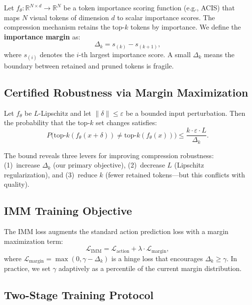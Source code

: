 \documentclass[10pt,twocolumn]{article}
\newcommand{\dk}{\Delta_k}
\newcommand{\eps}{\varepsilon}
\begin{document}
Let $f_\theta: \mathbb{R}^{N \times d} \to \mathbb{R}^N$ be a token importance scoring function (e.g., ACIS) that maps $N$ visual tokens of dimension $d$ to scalar importance scores. The compression mechanism retains the top-$k$ tokens by importance. We define the \textbf{importance margin} as:
\begin{equation}
    \dk = s_{(k)} - s_{(k+1)},
\end{equation}
where $s_{(i)}$ denotes the $i$-th largest importance score. A small $\dk$ means the boundary between retained and pruned tokens is fragile.

\subsection{Certified Robustness via Margin Maximization}

\begin{theorem}
\label{thm:bound}
Let $f_\theta$ be $L$-Lipschitz and let $\|\delta\| \leq \eps$ be a bounded input perturbation. Then the probability that the top-$k$ set changes satisfies:
\begin{equation}
    P\big(\text{top-}k(f_\theta(x + \delta)) \neq \text{top-}k(f_\theta(x))\big) \leq \frac{k \cdot \eps \cdot L}{\dk}.
    \label{eq:bound}
\end{equation}
\end{theorem}

The bound reveals three levers for improving compression robustness: (1)~increase $\dk$ (our primary objective), (2)~decrease $L$ (Lipschitz regularization), and (3)~reduce $k$ (fewer retained tokens---but this conflicts with quality).

\subsection{IMM Training Objective}

The IMM loss augments the standard action prediction loss with a margin maximization term:
\begin{equation}
    \mathcal{L}_{\text{IMM}} = \mathcal{L}_{\text{action}} + \lambda \cdot \mathcal{L}_{\text{margin}},
\end{equation}
where $\mathcal{L}_{\text{margin}} = \max(0, \gamma - \dk)$ is a hinge loss that encourages $\dk \geq \gamma$. In practice, we set $\gamma$ adaptively as a percentile of the current margin distribution.

\subsection{Two-Stage Training Protocol}
\end{document}
